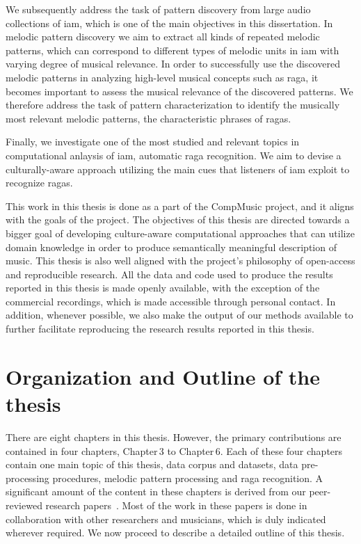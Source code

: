 We subsequently address the task of pattern discovery from large audio collections of \gls{iam}, which is one of the main objectives in this dissertation. In melodic pattern discovery we aim to extract all kinds of repeated melodic patterns, which can correspond to different types of melodic units in \gls{iam} with varying degree of musical relevance. In order to successfully use the discovered melodic patterns in analyzing high-level musical concepts such as \gls{raga}, it becomes important to assess the musical relevance of the discovered patterns. We therefore address the task of pattern characterization to identify the musically most relevant melodic patterns, the characteristic phrases of \glspl{raga}.

Finally, we investigate one of the most studied and relevant topics in computational anlaysis of \gls{iam}, automatic \gls{raga} recognition. We aim to devise a culturally-aware approach utilizing the main cues that listeners of \gls{iam} exploit to recognize \glspl{raga}. 

This work in this thesis is done as a part of the CompMusic project, and it aligns with the goals of the project. The objectives of this thesis are directed towards a bigger goal of developing culture-aware computational approaches that can utilize domain knowledge in order to produce semantically meaningful description of music. This thesis is also well aligned with the project's philosophy of open-access and reproducible research. All the data and code used to produce the results reported in this thesis is made openly available, with the exception of the commercial recordings, which is made accessible through personal contact. In addition, whenever possible, we also make the output of our methods available to further facilitate reproducing the research results reported in this thesis.




\section{Organization and Outline of the thesis}
\label{sec:intro_organization}

There are eight chapters in this thesis. However, the primary contributions are contained in four chapters, Chapter\,3 to Chapter\,6. Each of these four chapters contain one main topic of this thesis, data corpus and datasets, data pre-processing procedures, melodic pattern processing and \gls{raga} recognition. A significant amount of the content in these chapters is derived from our peer-reviewed research papers~\cite{Gulati2014Tonic,gulati2014Landmark,gulati_SITIS_2014,gulati_ICASSP2015,gulati_ISMIR_2015,gulati_communities_2016,gulatiphrase_2016,gulati_tdms_2016}. Most of the work in these papers is done in collaboration with other researchers and musicians, which is duly indicated wherever required. We now proceed to describe a detailed outline of this thesis.

